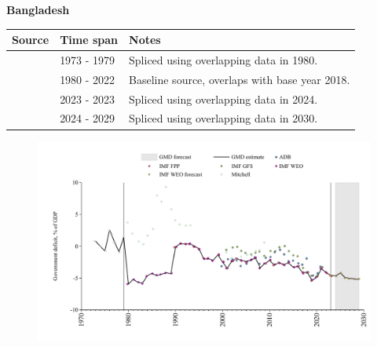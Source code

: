 \documentclass[12pt,a4paper,landscape]{article}
\begin{document}
\begin{adjustbox}{max totalsize={\paperwidth}{\paperheight},center}
\begin{minipage}[t][\textheight][t]{\textwidth}
\vspace*{0.5cm}
{}
\begin{center}
{\Large\bfseries Bangladesh}
\end{center}
\vspace{0.5cm}
\begin{table}[H]
\centering
\small
\begin{tabular}{|l|l|l|}
\hline
\textbf{Source} & \textbf{Time span} & \textbf{Notes} \\
\hline
\rowcolor{white}\cite{Mitchell}& 1973 - 1979 &Spliced using overlapping data in 1980.\\
\rowcolor{lightgray}\cite{IMF_WEO}& 1980 - 2022 &Baseline source, overlaps with base year 2018.\\
\rowcolor{white}\cite{IMF_FPP}& 2023 - 2023 &Spliced using overlapping data in 2024.\\
\rowcolor{lightgray}\cite{IMF_WEO_forecast}& 2024 - 2029 &Spliced using overlapping data in 2030.\\
\hline
\end{tabular}
\end{table}
\begin{figure}[H]
\centering
\includegraphics[width=\textwidth,height=0.6\textheight,keepaspectratio]{graphs/BGD_govdef_GDP.pdf}
\end{figure}
\end{minipage}
\end{adjustbox}
\end{document}
